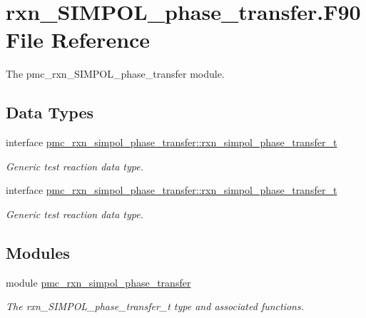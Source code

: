 \hypertarget{rxn___s_i_m_p_o_l__phase__transfer_8_f90}{}\section{rxn\+\_\+\+S\+I\+M\+P\+O\+L\+\_\+phase\+\_\+transfer.\+F90 File Reference}
\label{rxn___s_i_m_p_o_l__phase__transfer_8_f90}


The pmc\+\_\+rxn\+\_\+\+S\+I\+M\+P\+O\+L\+\_\+phase\+\_\+transfer module.  


\subsection*{Data Types}
\begin{DoxyCompactItemize}
\item 
interface \mbox{\hyperlink{structpmc__rxn__simpol__phase__transfer_1_1rxn__simpol__phase__transfer__t}{pmc\+\_\+rxn\+\_\+simpol\+\_\+phase\+\_\+transfer\+::rxn\+\_\+simpol\+\_\+phase\+\_\+transfer\+\_\+t}}
\begin{DoxyCompactList}\small\item\em Generic test reaction data type. \end{DoxyCompactList}\item 
interface \mbox{\hyperlink{structpmc__rxn__simpol__phase__transfer_1_1rxn__simpol__phase__transfer__t}{pmc\+\_\+rxn\+\_\+simpol\+\_\+phase\+\_\+transfer\+::rxn\+\_\+simpol\+\_\+phase\+\_\+transfer\+\_\+t}}
\begin{DoxyCompactList}\small\item\em Generic test reaction data type. \end{DoxyCompactList}\end{DoxyCompactItemize}
\subsection*{Modules}
\begin{DoxyCompactItemize}
\item 
module \mbox{\hyperlink{namespacepmc__rxn__simpol__phase__transfer}{pmc\+\_\+rxn\+\_\+simpol\+\_\+phase\+\_\+transfer}}
\begin{DoxyCompactList}\small\item\em The rxn\+\_\+\+S\+I\+M\+P\+O\+L\+\_\+phase\+\_\+transfer\+\_\+t type and associated functions. \end{DoxyCompactList}\end{DoxyCompactItemize}
